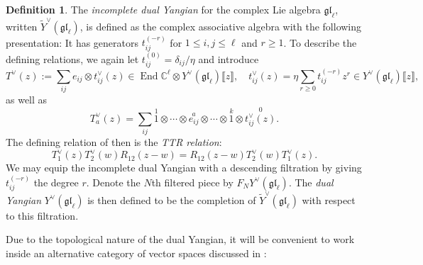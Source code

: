 \documentclass[11pt]{report}
\theoremstyle{definition}
\newtheorem{definition}[theorem]{Definition}
\theoremstyle{remark}
\theoremstyle{remark}
\newcommand{\End}{\operatorname{End}}
\newcommand{\C}{\mathbb{C}}
\begin{document}
\begin{definition}
The \emph{incomplete dual Yangian} for the complex Lie algebra $\mathfrak{gl}_\ell$, written $\widetilde Y^\vee(\mathfrak{gl}_\ell)$, is defined as the complex associative algebra with the following presentation: It has generators $t_{ij}^{(-r)}$ for $1 \leq i,j \leq \ell$ and $r \geq 1$. To describe the defining relations, we again let $t_{ij}^{(0)} = \delta_{ij}/\eta$ and introduce
\begin{equation*}
T^\vee(z) := \sum_{ij} e_{ij} \otimes t_{ij}^\vee(z) \in \End \C^\ell \otimes Y^\vee(\mathfrak{gl}_\ell)\llbracket z \rrbracket, \quad t_{ij}^\vee(z) = \eta \sum_{r \geq 0} t_{ij}^{(-r)} z^r \in Y^\vee(\mathfrak{gl}_\ell)\llbracket z \rrbracket,
\end{equation*}
as well as
\begin{equation*}
T_a^\vee(z) = \sum_{ij} \overset{1}{1} \otimes \cdots \otimes \overset{a}{e_{ij}} \otimes \cdots \otimes \overset{k}{1} \otimes \overset{0}{t_{ij}^\vee(z)}.
\end{equation*}
The defining relation of then is the \emph{TTR relation}:
\begin{equation}\label{equation:TTRRelation}
T_1^\vee(z) T_2^\vee(w) R_{12}(z-w) = R_{12}(z-w) T_2^\vee(w) T_1^\vee(z).
\end{equation}
We may equip the incomplete dual Yangian with a descending filtration by giving $t_{ij}^{(-r)}$ the degree $r$. Denote the $N$th filtered piece by $F_N Y^\vee(\mathfrak{gl}_\ell)$. The \emph{dual Yangian} $Y^\vee(\mathfrak{gl}_\ell)$ is then defined to be the completion of $\widetilde{Y}^\vee(\mathfrak{gl}_\ell)$ with respect to this filtration.
\end{definition}

Due to the topological nature of the dual Yangian, it will be convenient to work inside an alternative category of vector spaces discussed in \cite{article:costello:2013}:
\end{document}
